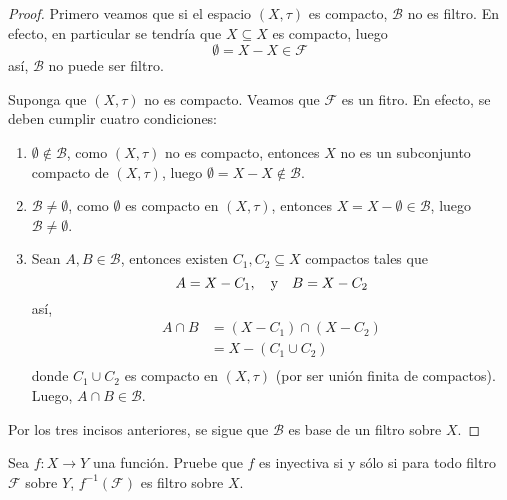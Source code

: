 \documentclass[12pt]{report}
\theoremstyle{largebreak}
\newcommand\cf[3]{\ensuremath{#1:#2\rightarrow#3}}
\begin{document}
    \begin{proof}
        Primero veamos que si el espacio $(X,\tau)$ es compacto, $\mathcal{B}$ no es filtro. En efecto, en particular se tendría que $X\subseteq X$ es compacto, luego
        \begin{equation*}
            \emptyset = X-X\in\mathcal{F}
        \end{equation*}
        así, $\mathcal{B}$ no puede ser filtro.

        Suponga que $(X,\tau)$ no es compacto. Veamos que $\mathcal{F}$ es un fitro. En efecto, se deben cumplir cuatro condiciones:
        \begin{enumerate}
            \item $\emptyset\notin\mathcal{B}$, como $(X,\tau)$ no es compacto, entonces $X$ no es un subconjunto compacto de $(X,\tau)$, luego $\emptyset=X-X\notin\mathcal{B}$.
            \item $\mathcal{B}\neq\emptyset$, como $\emptyset$ es compacto en $(X,\tau)$, entonces $X=X-\emptyset\in\mathcal{B}$, luego $\mathcal{B}\neq\emptyset$.
            \item Sean $A,B\in\mathcal{B}$, entonces existen $C_1,C_2\subseteq X$ compactos tales que
            \begin{equation*}
                A=X-C_1,\quad\textup{y}\quad B=X-C_2
            \end{equation*}
            así,
            \begin{equation*}
                \begin{split}
                    A\cap B&=(X-C_1)\cap (X-C_2)\\
                    &=X-(C_1\cup C_2)\\
                \end{split}
            \end{equation*}
            donde $C_1\cup C_2$ es compacto en $(X,\tau)$ (por ser unión finita de compactos). Luego, $A\cap B\in\mathcal{B}$.
        \end{enumerate}
        Por los tres incisos anteriores, se sigue que $\mathcal{B}$ es base de un filtro sobre $X$.
    \end{proof}

    \begin{excer}
        Sea $\cf{f}{X}{Y}$ una función. Pruebe que $f$ es inyectiva si y sólo si para todo filtro $\mathcal{F}$ sobre $Y$, $f^{-1}(\mathcal{F})$ es filtro sobre $X$.
    \end{excer}
\end{document}
